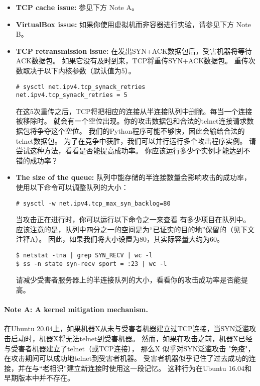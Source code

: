 \begin{itemize}
  \item \textbf{TCP cache issue:} 参见下方 Note A。

  \item \textbf{VirtualBox issue:} 如果你使用虚拟机而非容器进行实验，请参见下方 Note B。

  \item \textbf{TCP retransmission issue:} 
    在发出SYN+ACK数据包后，受害机器将等待ACK数据包。
    如果它没有及时到来，TCP将重传SYN+ACK数据包。
    重传次数取决于以下内核参数（默认值为5）。
    
\begin{lstlisting}
# sysctl net.ipv4.tcp_synack_retries
net.ipv4.tcp_synack_retries = 5
\end{lstlisting}

    在这5次重传之后，TCP将把相应的连接从半连接队列中删除。每当一个连接被移除时。
    就会有一个空位出现。你的攻击数据包和合法的telnet连接请求数据包将争夺这个空位。
    我们的Python程序可能不够快，因此会输给合法的telnet数据包。
    为了在竞争中获胜，我们可以并行运行多个攻击程序实例。
    请尝试这种方法，看看是否能提高成功率。
    你应该运行多少个实例才能达到不错的成功率？

  \item \textbf{The size of the queue:}  
    队列中能存储的半连接数量会影响攻击的成功率，使用以下命令可以调整队列的大小：

\begin{lstlisting}
# sysctl -w net.ipv4.tcp_max_syn_backlog=80
\end{lstlisting}
     
    当攻击正在进行时，你可以运行以下命令之一来查看
    有多少项目在队列中。应该注意的是，队列中四分之一的空间是为“已证实的目的地”保留的（见下文注释A）。
    因此，如果我们将大小设置为80，其实际容量大约为60。

\begin{lstlisting}
$ netstat -tna | grep SYN_RECV | wc -l
$ ss -n state syn-recv sport = :23 | wc -l
\end{lstlisting}

    请减少受害者服务器上的半连接队列的大小，看看你的攻击成功率是否能提高。
\end{itemize}


\paragraph{Note A: A kernel mitigation mechanism.}

在Ubuntu 20.04上，如果机器X从未与受害者机器建立过TCP连接，当SYN泛滥攻击启动时，机器X将无法telnet到受害机器。
然而，如果在攻击之前，机器X已经与受害者机器建立了telnet（或TCP连接），
那么X 似乎对SYN泛滥攻击 "免疫"，在攻击期间可以成功地telnet到受害者机器。
受害者机器似乎记住了过去成功的连接，并在与“老相识”建立新连接时使用这一段记忆。
这种行为在Ubuntu 16.04和早期版本中并不存在。

